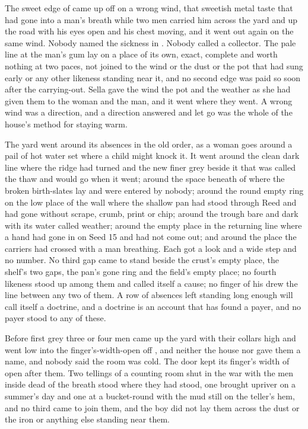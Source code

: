 The sweet edge of  came up off  on a wrong wind, that sweetish metal taste that had gone into a man's breath while two men carried him across the yard and up the road with his eyes open and his chest moving, and it went out again on the same wind. Nobody named the sickness in . Nobody called a collector. The pale line at the man's gum lay on a place of its own, exact, complete and worth nothing at two paces, not joined to the wind or the dust or the pot that had sung early or any other likeness standing near it, and no second edge was paid so soon after the carrying-out. Sella gave the wind the pot and the weather as she had given them to the woman and the man, and it went where they went. A wrong wind was a direction, and a direction answered and let go was the whole of the house's method for staying warm.

\scenebreak

The yard went around its absences in the old order, as a woman goes around a pail of hot water set where a child might knock it. It went around the clean dark line where the  ridge had turned and the new finer grey beside it that was called the thaw and would go when it went; around the space beneath  of  where the broken birth-slates lay and were entered by nobody; around the round empty ring on the low place of the wall where the shallow pan had stood through Reed and had gone without scrape, crumb, print or chip; around the trough bare and dark with its water called weather; around the empty place in the returning line where a hand had gone in on Seed 15 and had not come out; and around the place the carriers had crossed with a man breathing. Each got a look and a wide step and no number. No third gap came to stand beside the crust's empty place, the shelf's two gaps, the pan's gone ring and the field's empty place; no fourth likeness stood up among them and called itself a cause; no finger of his drew the line between any two of them. A row of absences left standing long enough will call itself a doctrine, and a doctrine is an account that has found a payer, and no payer stood to any of these.

\scenebreak

Before first grey three or four men came up the yard with their collars high and went low into the finger's-width-open  off , and neither the house nor  gave them a name, and nobody said the room was cold. The door kept its finger's width of open after them. Two tellings of a counting room shut in the war with the men inside dead of the breath stood where they had stood, one brought upriver on a summer's day and one at a bucket-round with the mud still on the teller's hem, and no third came to join them, and the boy did not lay them across the dust or the iron or anything else standing near them.


